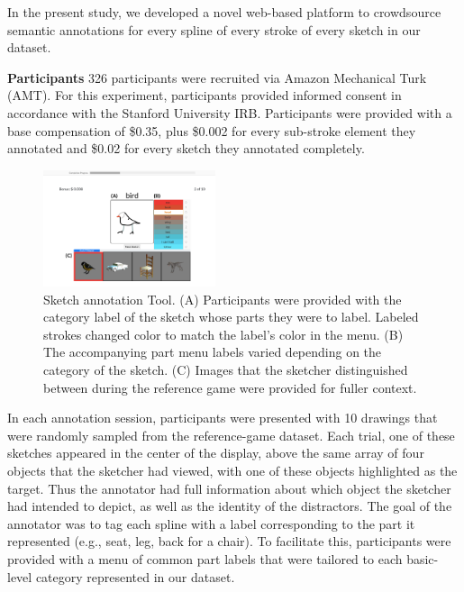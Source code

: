 \documentclass[10pt,letterpaper]{article}
\begin{document}
In the present study, we developed a novel web-based platform to crowdsource semantic annotations for every spline of every stroke of every sketch in our dataset. 

\noindent \textbf{Participants} \hspace{3mm} 
326 participants were recruited via Amazon Mechanical Turk (AMT).  
For this experiment, participants provided informed consent in accordance with the Stanford University IRB. 
Participants were provided with a base compensation of \$0.35, plus \$0.002 for every sub-stroke element they annotated and \$0.02 for every sketch they annotated completely. 

\begin{figure}[htbp]
\centering
\includegraphics[width=0.45\textwidth]{figures/annotation_tool.pdf}
\caption{Sketch annotation Tool. (A) Participants were provided with the category label of the sketch whose parts they were to label. Labeled strokes changed color to match the label's color in the menu. (B) The accompanying part menu labels varied depending on the category of the sketch. (C) Images that the sketcher distinguished between during the reference game were provided for fuller context.}
\label{refgame_performance}
\end{figure}

In each annotation session, participants were presented with 10 drawings that were randomly sampled from the reference-game dataset. 
Each trial, one of these sketches appeared in the center of the display, above the same array of four objects that the sketcher had viewed, with one of these objects highlighted as the target. 
Thus the annotator had full information about which object the sketcher had intended to depict, as well as the identity of the distractors. 
The goal of the annotator was to tag each spline with a label corresponding to the part it represented (e.g., seat, leg, back for a chair). 
To facilitate this, participants were provided with a menu of common part labels that were tailored to each basic-level category represented in our dataset. 
\end{document}
